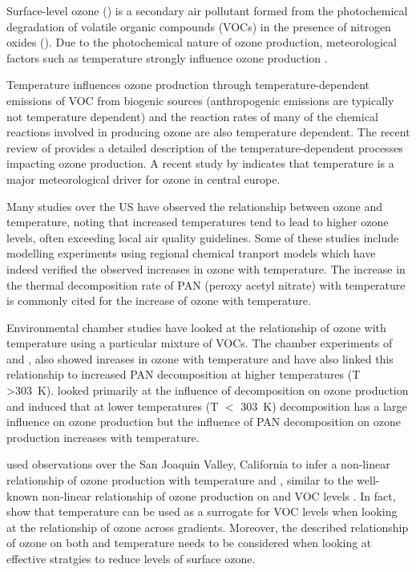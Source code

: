 Surface-level ozone () is a secondary air pollutant formed from the photochemical degradation of volatile organic compounds (VOCs) in the presence of nitrogen oxides ().
Due to the photochemical nature of ozone production, meteorological factors such as temperature strongly influence ozone production \citep{Jacob:2009}.

Temperature influences ozone production through temperature-dependent emissions of VOC from biogenic sources (anthropogenic emissions are typically not temperature dependent) and the reaction rates of many of the chemical reactions involved in producing ozone are also temperature dependent.
The recent review of \citet{Pusede:2015} provides a detailed description of the temperature-dependent processes impacting ozone production.
A recent study by \citet{Otero:2016} indicates that temperature is a major meteorological driver for ozone in central europe.

Many studies over the US \citep{Sillman:1995a, Dawson:2007, Pusede:2014} have observed the relationship between ozone and temperature, noting that increased temperatures tend to lead to higher ozone levels, often exceeding local air quality guidelines.
Some of these studies \citep{Sillman:1995a, Dawson:2007} include modelling experiments using regional chemical tranport models which have indeed verified the observed increases in ozone with temperature.
The increase in the thermal decomposition rate of PAN (peroxy acetyl nitrate) with temperature is commonly cited for the increase of ozone with temperature.

Environmental chamber studies have looked at the relationship of ozone with temperature using a particular mixture of VOCs.
The chamber experiments of \citet{Carter:1979} and \citet{Hatakeyama:1991}, also showed inreases in ozone with temperature and have also linked this relationship to increased PAN decomposition at higher temperatures (T \textgreater 303~K).
\citet{Hatakeyama:1991} looked primarily at the influence of  decomposition on ozone production and induced that at lower temperatures (T $<$ 303~K)  decomposition has a large influence on ozone production but the influence of PAN decomposition on ozone production increases with temperature.

\citet{Pusede:2014} used observations over the San Joaquin Valley, California to infer a non-linear relationship of ozone production with temperature and , similar to the well-known non-linear relationship of ozone production on  and VOC levels \citep{Sillman:1999}.
In fact, \citet{Pusede:2014} show that temperature can be used as a surrogate for VOC levels when looking at the relationship of ozone across  gradients.
Moreover, the described relationship of ozone on both  and temperature needs to be considered when looking at effective stratgies to reduce levels of surface ozone.

